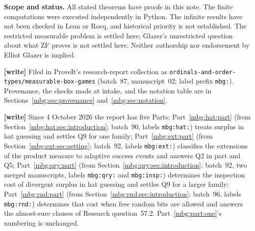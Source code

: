 \documentclass[11pt,letterpaper]{article}
\theoremstyle{definition}
\newcommand{\repo}{\texttt{ProveIt}}
\begin{document}
\begin{titlepage}
\begin{abstract}
The finite problem leads to a separate structural result. Blind binary output maps correspond to labeled perfect matchings of the hypercube, whereas executable maps correspond precisely to recursively sliceable matchings. We derive an exact inclusion--exclusion recurrence for the latter, prove that the two classes first differ at four boxes, and establish
\[
 F_n=\frac{e^{\gamma 2^n}}{n}\left(1-\frac{3}{2n}+\frac{17}{4n^2}
 -\frac{12}{n^3}+O(n^{-4})\right),
\]
with a rational algorithm for every further asymptotic coefficient. We also prove an explicit doubly exponential upper bound on the fraction of blind maps that are executable. Finite checks, an oracle counterexample-extraction theorem, and a Busy Beaver obstruction connect the analysis to the certificate-oriented architecture of \repo.
\end{abstract}
\vfill
\begin{resultbox}
\textbf{Scope and status.} All stated theorems have proofs in this note. The finite computations were executed independently in Python. The infinite results have not been checked in Lean or Rocq, and historical priority is not established. The restricted measurable problem is settled here; Glazer's unrestricted question about what ZF proves is not settled here. Neither authorship nor endorsement by Elliot Glazer is implied.
\end{resultbox}
\smallskip
{\footnotesize\textbf{[write]} Filed in ProveIt's research-report collection as \texttt{ordinals-and-order-types/measurable-box-games} (batch~87, manuscript~02; label prefix \texttt{mbg:}). Provenance, the checks made at intake, and the notation table are in Sections~\ref{mbg:sec:provenance} and~\ref{mbg:sec:notation}.\par}
\end{titlepage}
\hypersetup{pageanchor=true}
{\footnotesize\noindent\textbf{[write]} Since 4 October 2026 the report has five Parts: Part~\ref{mbg:hat:part} (from Section~\ref{mbg:hat:sec:introduction}; batch~90, labels \texttt{mbg:hat:}) treats surplus in hat guessing and settles Q9 for one family; Part~\ref{mbg:ext:part} (from Section~\ref{mbg:ext:sec:setting}; batch~92, labels \texttt{mbg:ext:}) classifies the extensions of the product measure to adaptive success events and answers Q2 in part and Q5; Part~\ref{mbg:qry:part} (from Section~\ref{mbg:qry:sec:introduction}; batch~92, two merged manuscripts, labels \texttt{mbg:qry:} and \texttt{mbg:insp:}) determines the inspection cost of divergent surplus in hat guessing and settles Q9 for a larger family; Part~\ref{mbg:rnd:part} (from Section~\ref{mbg:rnd:sec:introduction}; batch~96, labels \texttt{mbg:rnd:}) determines that cost when free random bits are allowed and answers the almost-sure clauses of Research question~57.2. Part~\ref{mbg:part:one}'s numbering is unchanged.\par}
\tableofcontents
\newpage
\end{document}
